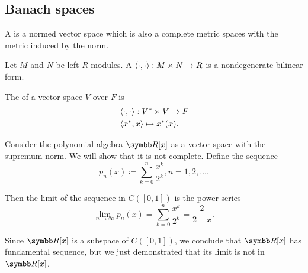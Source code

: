 \subsection{Banach spaces}\label{subsec:banach_spaces}

\begin{definition}\label{def:banach_space}
  A  is a normed vector space which is also a complete metric spaces with the metric induced by the norm.
\end{definition}

\begin{definition}\label{def:topological_duality_pairing}
  Let \( M \) and \( N \) be left \( R \)-modules. A  \( \left\langle \cdot, \cdot \right\rangle: M \times N \to R \) is a nondegenerate bilinear form.

  The  of a vector space \( V \) over \( F \) is
  \begin{align*}
    &\left\langle \cdot, \cdot \right\rangle: V^* \times V \to F \\
    &\left\langle x^*, x \right\rangle \mapsto x^*(x).
  \end{align*}
\end{definition}

\begin{example}\label{ex:noncomplete_normed_space}\cite{MathCounterExamples:noncomplete_normed_space}
  Consider the polynomial algebra \( \BR[x] \) as a vector space with the supremum norm. We will show that it is not complete. Define the sequence
  \begin{equation*}
    p_n(x) \coloneqq \sum_{k=0}^n \frac{x^k} {2^k}, n = 1, 2, \ldots.
  \end{equation*}

  Then the limit of the sequence in \( C([0, 1]) \) is the power series
  \begin{equation*}
    \lim_{n \to \infty} p_n(x)
    =
    \sum_{k=0}^n \frac{x^k} {2^k}
    =
    \frac 2 {2 - x}.
  \end{equation*}

  Since \( \BR[x] \) is a subspace of \( C([0, 1]) \), we conclude that \( \BR[x] \) has fundamental sequence, but we just demonstrated that its limit is not in \( \BR[x] \).
\end{example}

